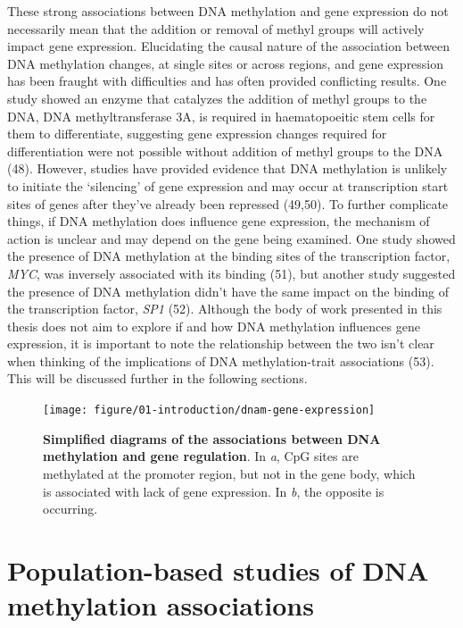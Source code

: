 \documentclass[11pt,oneside]{bristolthesis}
\begin{document}
These strong associations between DNA methylation and gene expression do not necessarily mean that the addition or removal of methyl groups will actively impact gene expression. Elucidating the causal nature of the association between DNA methylation changes, at single sites or across regions, and gene expression has been fraught with difficulties and has often provided conflicting results. One study showed an enzyme that catalyzes the addition of methyl groups to the DNA, DNA methyltransferase 3A, is required in haematopoeitic stem cells for them to differentiate, suggesting gene expression changes required for differentiation were not possible without addition of methyl groups to the DNA (48). However, studies have provided evidence that DNA methylation is unlikely to initiate the `silencing' of gene expression and may occur at transcription start sites of genes after they've already been repressed (49,50). To further complicate things, if DNA methylation does influence gene expression, the mechanism of action is unclear and may depend on the gene being examined. One study showed the presence of DNA methylation at the binding sites of the transcription factor, \emph{MYC}, was inversely associated with its binding (51), but another study suggested the presence of DNA methylation didn't have the same impact on the binding of the transcription factor, \emph{SP1} (52). Although the body of work presented in this thesis does not aim to explore if and how DNA methylation influences gene expression, it is important to note the relationship between the two isn't clear when thinking of the implications of DNA methylation-trait associations (53). This will be discussed further in the following sections.




\begin{figure}

{\centering \texttt{[image: figure/01-introduction/dnam-gene-expression]} 

}

\caption[Simplified diagrams of the associations between DNA methylation and gene regulation]{\textbf{Simplified diagrams of the associations between DNA methylation and gene regulation}. In \emph{a}, CpG sites are methylated at the promoter region, but not in the gene body, which is associated with lack of gene expression. In \emph{b}, the opposite is occurring.}\label{fig:dnam-functions}
\end{figure}
\hypertarget{dnam-phs}{%
\section{Population-based studies of DNA methylation associations}\label{dnam-phs}}
\end{document}
